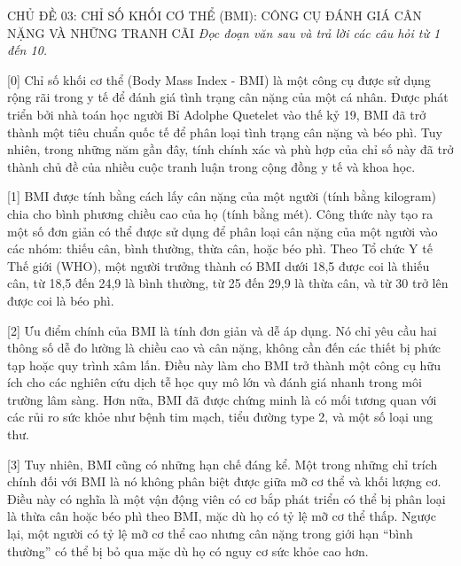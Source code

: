 \documentclass[12pt,a4paper,twoside]{article}
\newenvironment{readingpassage}[1][]{%
    \begin{tcolorbox}[enhanced, colback=grayLight, colframe=secondaryBlue,
        coltitle=textDark, fonttitle=\bfseries, title={#1},
        rounded corners, arc=3mm, boxrule=1pt,
        left=15pt, right=15pt, top=10pt, bottom=10pt,
        breakable, before skip=10pt, after skip=10pt, drop fuzzy shadow]
    \setstretch{1.3}
}{\end{tcolorbox}}
\begin{document}
\newpage
\label{a_cd03}
\begin{topicbox}{\large CHỦ ĐỀ 03: CHỈ SỐ KHỐI CƠ THỂ (BMI): CÔNG CỤ ĐÁNH GIÁ CÂN NẶNG VÀ NHỮNG TRANH CÃI}
\vspace{8pt}
\textit{Đọc đoạn văn sau và trả lời các câu hỏi từ 1 đến 10.}
\vspace{6pt}
\end{topicbox}
\vspace{5pt}
\begin{readingpassage}[]
[0] Chỉ số khối cơ thể (Body Mass Index - BMI) là một công cụ được sử dụng rộng rãi trong y tế để đánh giá tình trạng cân nặng của một cá nhân. Được phát triển bởi nhà toán học người Bỉ Adolphe Quetelet vào thế kỷ 19, BMI đã trở thành một tiêu chuẩn quốc tế để phân loại tình trạng cân nặng và béo phì. Tuy nhiên, trong những năm gần đây, tính chính xác và phù hợp của chỉ số này đã trở thành chủ đề của nhiều cuộc tranh luận trong cộng đồng y tế và khoa học.

[1] BMI được tính bằng cách lấy cân nặng của một người (tính bằng kilogram) chia cho bình phương chiều cao của họ (tính bằng mét). Công thức này tạo ra một số đơn giản có thể được sử dụng để phân loại cân nặng của một người vào các nhóm: thiếu cân, bình thường, thừa cân, hoặc béo phì. Theo Tổ chức Y tế Thế giới (WHO), một người trưởng thành có BMI dưới 18,5 được coi là thiếu cân, từ 18,5 đến 24,9 là bình thường, từ 25 đến 29,9 là thừa cân, và từ 30 trở lên được coi là béo phì.

[2] Ưu điểm chính của BMI là tính đơn giản và dễ áp dụng. Nó chỉ yêu cầu hai thông số dễ đo lường là chiều cao và cân nặng, không cần đến các thiết bị phức tạp hoặc quy trình xâm lấn. Điều này làm cho BMI trở thành một công cụ hữu ích cho các nghiên cứu dịch tễ học quy mô lớn và đánh giá nhanh trong môi trường lâm sàng. Hơn nữa, BMI đã được chứng minh là có mối tương quan với các rủi ro sức khỏe như bệnh tim mạch, tiểu đường type 2, và một số loại ung thư.

[3] Tuy nhiên, BMI cũng có những hạn chế đáng kể. Một trong những chỉ trích chính đối với BMI là nó không phân biệt được giữa mỡ cơ thể và khối lượng cơ. Điều này có nghĩa là một vận động viên có cơ bắp phát triển có thể bị phân loại là thừa cân hoặc béo phì theo BMI, mặc dù họ có tỷ lệ mỡ cơ thể thấp. Ngược lại, một người có tỷ lệ mỡ cơ thể cao nhưng cân nặng trong giới hạn ``bình thường'' có thể bị bỏ qua mặc dù họ có nguy cơ sức khỏe cao hơn.


\end{readingpassage}
\end{document}
